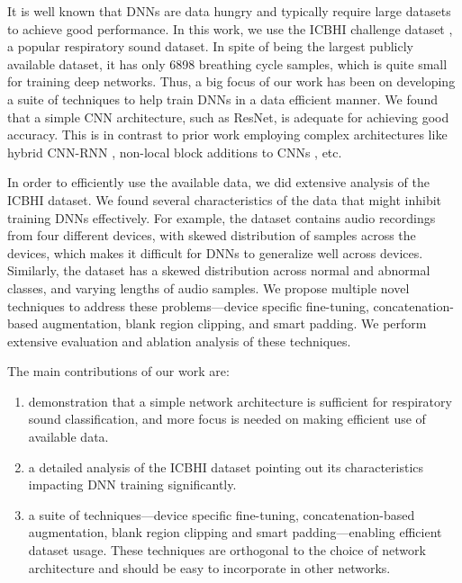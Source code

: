 \documentclass{article}
\begin{document}
It is well known that DNNs are data hungry and typically require large datasets to achieve good performance. In this work, we use the ICBHI challenge dataset \cite{icbhi_17}, a popular respiratory sound dataset.
In spite of being the largest publicly available dataset, it has only 6898 breathing cycle samples, which is quite small for training deep networks. Thus, a big focus of our work has been on developing a suite of techniques to help train DNNs in a data efficient manner. We found that a simple CNN architecture, such as ResNet, is adequate for achieving good accuracy. This is in contrast to prior work employing complex architectures like hybrid CNN-RNN \citep{acharya_20}, non-local block additions to CNNs \citep{lungrn_20}, etc.

In order to efficiently use the available data, we did extensive analysis of the ICBHI dataset. We found several characteristics of the data that might inhibit training DNNs effectively. For example, the dataset contains audio recordings from four different devices, with skewed distribution of samples across the devices, which makes it difficult for DNNs to generalize well across devices.
Similarly, the dataset has a skewed distribution across normal and abnormal classes, and varying lengths of audio samples.
We propose multiple novel techniques to address these problems---device specific fine-tuning, concatenation-based augmentation, blank region clipping, and smart padding. We perform extensive evaluation and ablation analysis of these techniques.

\noindent The main contributions of our work are:
\begin{enumerate}[nolistsep]
\item demonstration that a simple network architecture is sufficient for respiratory sound classification, and more focus is needed on making efficient use of available data.
\item a detailed analysis of the ICBHI dataset pointing out its characteristics impacting DNN training significantly.
\item a suite of techniques---device specific fine-tuning, concatenation-based augmentation, blank region clipping and smart padding---enabling efficient dataset usage. These techniques are orthogonal to the choice of network architecture and should be easy to incorporate in other networks. 
\end{enumerate} \vspace{-2mm}
\end{document}
